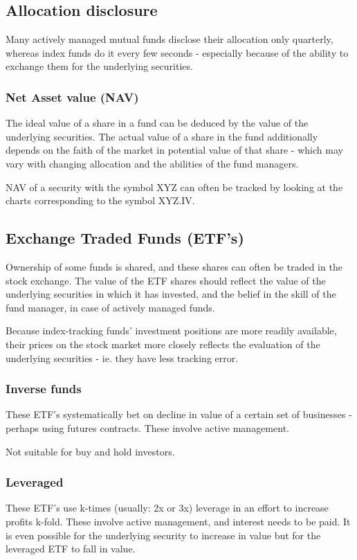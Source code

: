 \documentclass[oneside, article]{memoir}
\begin{document}
\subsection{Allocation disclosure}
Many actively managed mutual funds disclose their allocation only quarterly, whereas index funds do it every few seconds - especially because of the ability to exchange them for the underlying securities.

\subsubsection{Net Asset value (NAV)}
The ideal value of a share in a fund can be deduced by the value of the underlying securities. The actual value of a share in the fund additionally depends on the faith of the market in potential value of that share - which may vary with changing allocation and the abilities of the fund managers.

NAV of a security with the symbol XYZ can often be tracked by looking at the charts corresponding to the symbol XYZ.IV.

\subsection{Exchange Traded Funds (ETF's)}
Ownership of some funds is shared, and these shares can often be traded in the stock exchange. The value of the ETF shares should reflect the value of the underlying securities in which it has invested, and the belief in the skill of the fund manager, in case of actively managed funds.

Because index-tracking funds' investment positions are more readily available, their prices on the stock market more closely reflects the evaluation of the underlying securities - ie. they have less tracking error.

\subsubsection{Inverse funds}
These ETF's systematically bet on decline in value of a certain set of businesses - perhaps using futures contracts. These involve active management.

Not suitable for buy and hold investors.

\subsubsection{Leveraged}
These ETF's use k-times (usually: 2x or 3x) leverage in an effort to increase profits k-fold. These involve active management, and interest needs to be paid. It is even possible for the underlying security to increase in value but for the leveraged ETF to fall in value.
\end{document}
